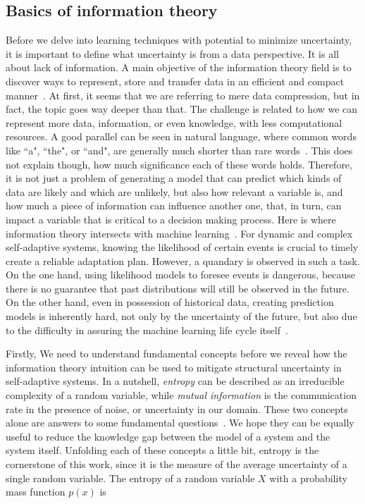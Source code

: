 
\subsection{Basics of information theory}
Before we delve into learning techniques with potential to minimize uncertainty, it is important to define what uncertainty is from a data perspective. It is all about lack of information. A main objective of the information theory field is to discover ways to represent, store and transfer data in an efficient and compact manner~\cite{shannon1948mathematical}. At first, it seems that we are referring to mere data compression, but in fact, the topic goes way deeper than that. The challenge is related to how we can represent more data, information, or even knowledge, with less computational resources. A good parallel can be seen in natural language, where common words like ``a", ``the", or ``and", are generally much shorter than rare words~\cite{robert2014machine}. This does not explain though, how much significance each of these words holds. Therefore, it is not just a problem of generating a model that can predict which kinds of data are likely and which are unlikely, but also how relevant a variable is, and how much a piece of information can influence another one, that, in turn, can impact a variable that is critical to a decision making process. Here is where information theory intersects with machine learning~\cite{mackay2003information}. For dynamic and complex self-adaptive systems, knowing the likelihood of certain events is crucial to timely create a reliable adaptation plan. However, a quandary is observed in such a task. On the one hand, using likelihood models to foresee events is dangerous, because there is no guarantee that past distributions will still be observed in the future. On the other hand, even in possession of historical data, creating prediction models is inherently hard, not only by the uncertainty of the future, but also due to the difficulty in assuring the machine learning life cycle itself~\cite{ashmore2019assuring}.

Firstly, We need to understand fundamental concepts before we reveal how the information theory intuition can be used to mitigate structural uncertainty in self-adaptive systems. In a nutshell, \textit{entropy} can be described as an irreducible complexity of a random variable, while \textit{mutual information} is the communication rate in the presence of noise, or uncertainty in our domain. These two concepts alone are answers to some fundamental questions~\cite{cover2012elements}. We hope they can be equally useful to reduce the knowledge gap between
the model of a system and the system itself. Unfolding each of these concepts a little bit, entropy is the cornerstone of this work, since it is the measure of the average uncertainty of a single random variable. The entropy of a random variable $X$ with a probability mass function $p(x)$ is 

